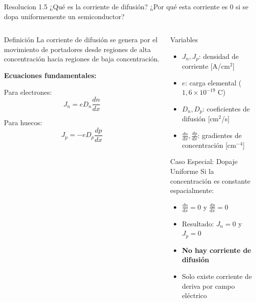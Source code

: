 \documentclass[
    10pt,
    aspectratio=169,
    xcolor={dvipsnames},
    spanish,
    ]{beamer}
\begin{document}
\begin{frame}
  \begin{block}{Resolucion 1.5}
    ¿Qué es la corriente de difusión? ¿Por qué esta corriente es $0$ si se dopa uniformemente un semiconductor?
  \end{block}
  
  \begin{columns}
    \begin{column}{0.5\textwidth}
      \begin{block}{Definición}
        \scriptsize
        La corriente de difusión se genera por el movimiento de portadores desde regiones de alta concentración hacia regiones de baja concentración.
        
        \vspace{0.3cm}
        \textbf{Ecuaciones fundamentales:}
        
        Para electrones:
        \begin{equation}
          J_n = eD_n \frac{dn}{dx}
        \end{equation}
        
        Para huecos:
        \begin{equation}
          J_p = -eD_p \frac{dp}{dx}
        \end{equation}
      \end{block}
    \end{column}
    
    \begin{column}{0.48\textwidth}
      \begin{block}{Variables}
        \scriptsize
        \begin{itemize}
          \item $J_n, J_p$: densidad de corriente [A/cm$^2$]
          \item $e$: carga elemental ($1{,}6 \times 10^{-19}$ C)
          \item $D_n, D_p$: coeficientes de difusión [cm$^2$/s]
                    \item $\frac{dn}{dx}, \frac{dp}{dx}$: gradientes de concentración [cm$^{-4}$]
        \end{itemize}
      \end{block}
      
      \begin{block}{Caso Especial: Dopaje Uniforme}
        \scriptsize
        Si la concentración es constante espacialmente:
        \begin{itemize}
          \item $\frac{dn}{dx} = 0$ y $\frac{dp}{dx} = 0$
          \item Resultado: $J_n = 0$ y $J_p = 0$
          \item \textbf{No hay corriente de difusión}
          \item Solo existe corriente de deriva por campo eléctrico
        \end{itemize}
      \end{block}
    \end{column}
  \end{columns}


\end{frame}
\end{document}
